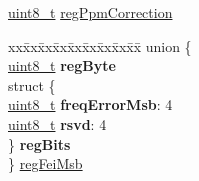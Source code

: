 \begin{DoxyCompactItemize}
\begin{tabbing}
\end{tabbing}\item 
\hyperlink{vl53l0x__types_8h_aba7bc1797add20fe3efdf37ced1182c5}{uint8\+\_\+t} \hyperlink{structFSK__Register__Map_ac69ff074c058d20d6947655b20a4f636}{reg\+Ppm\+Correction}
\item 
\begin{tabbing}
xx\=xx\=xx\=xx\=xx\=xx\=xx\=xx\=xx\=\kill
union \{\\
\>\hyperlink{vl53l0x__types_8h_aba7bc1797add20fe3efdf37ced1182c5}{uint8\_t} {\bfseries regByte}\\
\>struct \{\\
\>\>\hyperlink{vl53l0x__types_8h_aba7bc1797add20fe3efdf37ced1182c5}{uint8\_t} {\bfseries freqErrorMsb}: 4\\
\>\>\hyperlink{vl53l0x__types_8h_aba7bc1797add20fe3efdf37ced1182c5}{uint8\_t} {\bfseries rsvd}: 4\\
\>\} {\bfseries regBits}\\
\} \hyperlink{structFSK__Register__Map_a17653fab98463c389e0e1bae3a2d3f21}{regFeiMsb}\\


\end{tabbing}
\end{DoxyCompactItemize}

